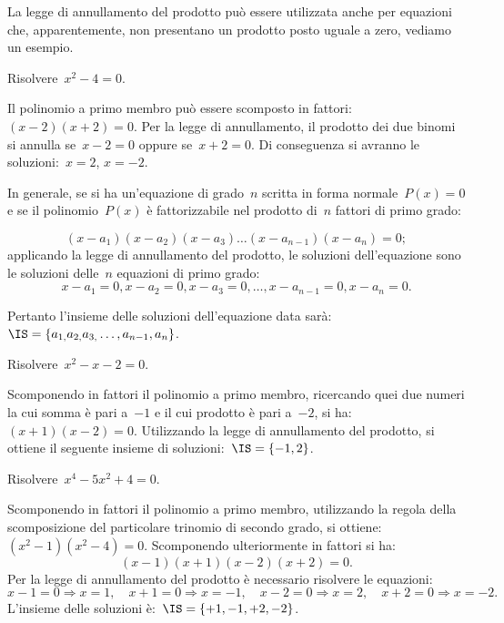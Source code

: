 La legge di annullamento del prodotto può essere utilizzata anche per 
equazioni che, apparentemente, non presentano un prodotto posto uguale a zero, 
vediamo un esempio.

 \begin{esempio}
Risolvere~$x^{2}-4=0$.

Il polinomio a primo membro può essere scomposto in fattori:~$(x-2)(x+2)=0$.
Per la legge di annullamento, il prodotto dei due binomi si annulla se~$x-2=0$ 
oppure se~$x+2=0$.
Di conseguenza si avranno le soluzioni:~$x=2$, $x=-2$.
 \end{esempio}

In generale, se si ha un'equazione di grado~$n$ scritta in forma 
normale~$P(x)=0$ e se il polinomio~$P(x)$ è fattorizzabile nel prodotto 
di~$n$ fattori di primo grado:

\begin{equation*}
(x-a_{1})(x-a_{2})(x-a_{3})\ldots (x-a_{n-1})(x-a_{n})=0;
\end{equation*}
applicando la legge di annullamento del prodotto, le soluzioni dell'equazione 
sono le soluzioni delle~$n$ equazioni di primo grado:
\begin{equation*}
x-a_{1}=0,x-a_{2}=0,x-a_{3}=0,\ldots, x-a_{n-1}=0,x-a_{n}=0.
\end{equation*}

Pertanto l'insieme delle soluzioni dell'equazione data 
sarà:~$\IS=\{a_{1,}a_{2,}a_{3,}\ldots,a_{n-1},a_{n}\}$.

\begin{exrig}
 \begin{esempio}
Risolvere~$x^{2}-x-2=0$.

Scomponendo in fattori il polinomio a primo membro, ricercando quei due numeri 
la cui somma è pari a~$-1$ e il cui prodotto è pari a~$-2$, 
si ha:~$(x+1)(x-2)=0$.
Utilizzando la legge di annullamento del prodotto, si ottiene il seguente 
insieme di soluzioni:~$\IS=\{-1,2\}$.
 \end{esempio}

 \begin{esempio}
Risolvere~$x^{4}-5x^{2}+4=0$.

Scomponendo in fattori il polinomio a primo membro, utilizzando la regola 
della scomposizione del particolare trinomio di secondo grado, si 
ottiene:~$(x^{2}-1)(x^{2}-4)=0$. Scomponendo ulteriormente in fattori si ha:
\begin{equation*}
(x-1)(x+1)(x-2)(x+2)=0.
\end{equation*}
Per la legge di annullamento del prodotto è necessario risolvere le equazioni:
\begin{equation*}
x-1=0 \Rightarrow x=1, \quad x+1=0 \Rightarrow x=-1,\quad 
x-2=0 \Rightarrow x=2, \quad x+2=0 \Rightarrow x=-2.
\end{equation*}
L'insieme delle soluzioni è:~$\IS=\{+1,-1,+2,-2\}$.
 \end{esempio}

\end{exrig}

